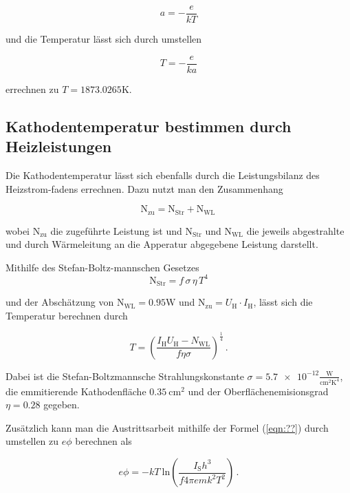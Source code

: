\begin{equation*}
      a = - \frac{e}{kT} 
\end{equation*}

und die Temperatur lässt sich durch umstellen 

\begin{equation*}
    T = - \frac{e}{ka} 
\end{equation*}

errechnen zu $ T = 1873.0265 \si{\kelvin}$.

\subsection{Kathodentemperatur bestimmen durch Heizleistungen}
Die Kathodentemperatur lässt sich ebenfalls durch die Leistungsbilanz des Heizstrom-fadens errechnen. Dazu nutzt man den Zusammenhang

\begin{equation}
    \label{eqn:zu}
    \text{N}_\text{zu} = \text{N}_\text{Str} + \text{N}_\text{WL} \,
\end{equation}

wobei $\text{N}_\text{zu}$ die zugeführte Leistung ist und $\text{N}_\text{Str}$ und $\text{N}_\text{WL}$ die jeweils abgestrahlte und durch Wärmeleitung an die Apperatur abgegebene Leistung
darstellt.

Mithilfe des Stefan-Boltz-mannschen Gesetzes
\begin{equation*}
    \text{N}_\text{Str} = f \, \sigma \, \eta \, T^4
\end{equation*}

und der Abschätzung von $\text{N}_\text{WL} = 0.95 \si{\watt}$ und $\text{N}_\text{zu} = U_\text{H} \cdot I_\text{H}$, lässt sich die Temperatur berechnen durch

\begin{equation}
    T = \left( \frac{I_\text{H} U_\text{H} - N_\text{WL}}{f \eta \sigma} \right)^{\frac{1}{4}} \, .
    \label{eqn:temp}
\end{equation}

Dabei ist die Stefan-Boltzmannsche Strahlungskonstante $\sigma = \num{5.7e-12}\frac{\text{W}}{\text{cm}^2\text{K}^4}$, die emmitierende Kathodenfläche
$\SI{0.35}{\centi\meter\squared}$ und der Oberflächenemisionsgrad $\eta = \num{0.28}$ gegeben.

Zusätzlich kann man die Austrittsarbeit mithilfe der Formel (\ref{eqn:??}) durch umstellen zu $ e \phi$ berechnen als

\begin{equation}
    e \phi = -k T \: \text{ln} \left( \frac{I_\text{S} h^3}{f 4 \pi e m k^2 T^2} \right) \, .
    \label{eqn:ephi}
\end{equation}

